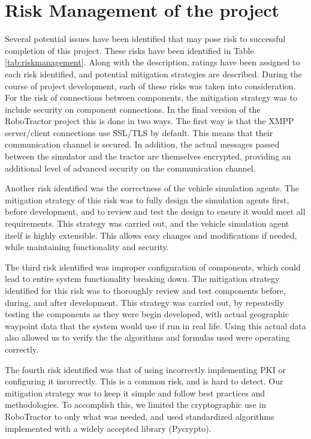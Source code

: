 \documentclass[conference,12pt]{IEEEtran}
\begin{document}
\section{Risk Management of the project}
Several potential issues have been identified that may pose risk to successful
completion of this project. These risks have been identified in Table
\ref{tab:riskmanagement}. Along with the description, ratings have been assigned
to each risk identified, and potential mitigation strategies are described. During the course of project development, each of these risks was taken into consideration. For the risk of connections between components, the mitigation strategy was to include security on component connections. In the final version of the RoboTractor project this is done in two ways. The first way is that the XMPP server/client connections use SSL/TLS by default. This means that their communication channel is secured. In addition, the actual messages passed between the simulator and the tractor are themselves encrypted, providing an additional level of advanced security on the communication channel. 

Another risk identified was the correctness of the vehicle simulation agents. The mitigation strategy of this risk was to fully design the simulation agents first, before development, and to review and test the design to ensure it would meet all requirements. This strategy was carried out, and the vehicle simulation agent itself is highly extensible. This allows easy changes and modifications if needed, while maintaining functionality and security. 

The third risk identified was improper configuration of components, which could lead to entire system functionality breaking down. The mitigation strategy identified for this risk was to thoroughly review and test components before, during, and after development. This strategy was carried out, by repeatedly testing the components as they were begin developed, with actual geographic waypoint data that the system would use if run in real life. Using this actual data also allowed us to verify the the algorithms and formulas used were operating correctly.

The fourth risk identified was that of using incorrectly implementing PKI or configuring it incorrectly. This is a common risk, and is hard to detect. Our mitigation strategy was to keep it simple and follow best practices and methodologies. To accomplish this, we limited the cryptographic use in RoboTractor to only what was needed, and used standardized algorithms implemented with a widely accepted library (Pycrypto). 
\end{document}
